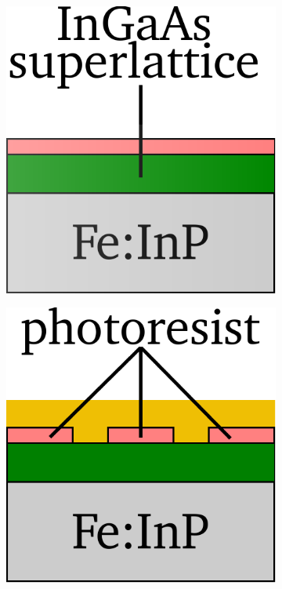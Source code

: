 \begin{figure}[!tbp]
    \centering
    \begin{subfigure}[b]{0.21\textwidth}
        \centering
        \includegraphics[width=\textwidth]{figures/Fabrication/fab1_1.pdf}
        \caption{\centering}
        \label{fig:fab11}
    \end{subfigure}
    \hfill
    \begin{subfigure}[b]{0.21\textwidth}
        \centering
        \includegraphics[width=\textwidth]{figures/Fabrication/fab1_2.pdf}

\end{subfigure}
\end{figure}
